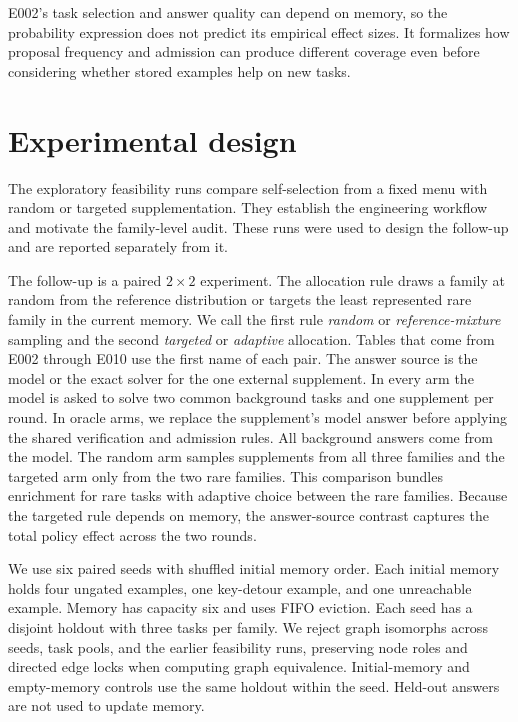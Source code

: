 \documentclass[11pt]{article}
\begin{document}
E002's task selection and answer quality can depend on memory, so the
probability expression does not predict its empirical effect sizes.
It formalizes how proposal frequency and admission can produce
different coverage even before considering whether stored examples
help on new tasks.

\section{Experimental design}

The exploratory feasibility runs compare self-selection from a fixed
menu with random or targeted supplementation. They establish the
engineering workflow and motivate the family-level audit. These runs
were used to design the follow-up and are reported separately from it.

The follow-up is a paired $2\times2$ experiment. The allocation rule
draws a family at random from the reference distribution or targets the
least represented rare family in the current memory. We call the first
rule \emph{random} or \emph{reference-mixture} sampling and the second
\emph{targeted} or \emph{adaptive} allocation. Tables that come from
E002 through E010 use the first name of each pair. The answer source
is the model or the exact solver for the one external supplement. In
every arm the model is asked to solve two common background tasks and
one supplement per round. In oracle arms, we replace the supplement's
model answer before applying the shared verification and admission rules.
All background answers come from the model. The random arm samples
supplements from all three families and the targeted arm only from
the two rare families. This comparison bundles enrichment for rare
tasks with adaptive choice between the rare families. Because the targeted rule
depends on memory, the answer-source contrast captures the total policy
effect across the two rounds.

We use six paired seeds with shuffled initial memory order. Each initial
memory holds four ungated examples, one key-detour example, and one
unreachable example.
Memory has capacity six and uses FIFO eviction. Each seed has a disjoint
holdout with three tasks per family. We reject graph
isomorphs across seeds, task pools, and the earlier feasibility runs,
preserving node roles and directed edge locks when computing graph
equivalence. Initial-memory and empty-memory controls use the same
holdout within the seed. Held-out answers are not used to update memory.
\end{document}
